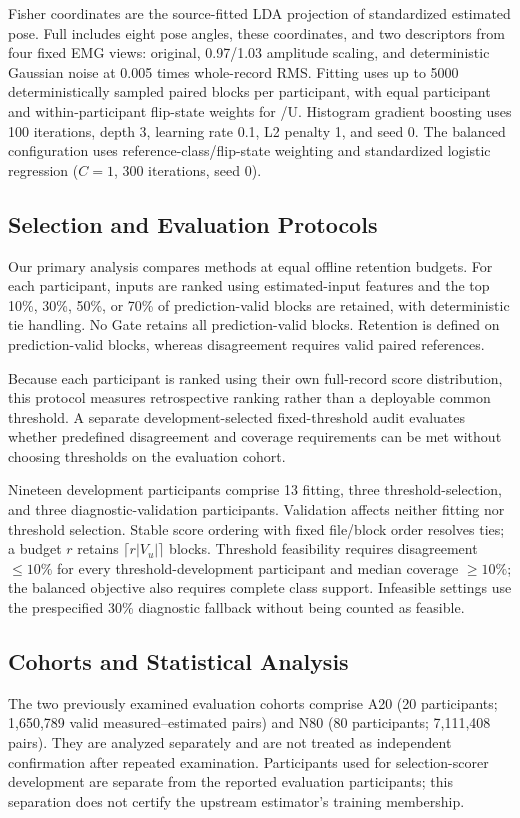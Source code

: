 \documentclass[conference,letterpaper]{IEEEtran}
\begin{document}
Fisher coordinates are the source-fitted LDA projection of standardized estimated pose. Full includes eight pose angles, these coordinates, and two descriptors from four fixed EMG views: original, 0.97/1.03 amplitude scaling, and deterministic Gaussian noise at 0.005 times whole-record RMS. Fitting uses up to 5000 deterministically sampled paired blocks per participant, with equal participant and within-participant flip-state weights for /U. Histogram gradient boosting uses 100 iterations, depth 3, learning rate 0.1, L2 penalty 1, and seed 0. The balanced configuration uses reference-class/flip-state weighting and standardized logistic regression (\(C=1\), 300 iterations, seed 0).



\subsection{Selection and Evaluation Protocols}\label{selection-and-evaluation-protocols}
Our primary analysis compares methods at equal offline retention budgets. For each participant, inputs are ranked using estimated-input features and the top 10\%, 30\%, 50\%, or 70\% of prediction-valid blocks are retained, with deterministic tie handling. No Gate retains all prediction-valid blocks. Retention is defined on prediction-valid blocks, whereas disagreement requires valid paired references.

Because each participant is ranked using their own full-record score distribution, this protocol measures retrospective ranking rather than a deployable common threshold. A separate development-selected fixed-threshold audit evaluates whether predefined disagreement and coverage requirements can be met without choosing thresholds on the evaluation cohort.

Nineteen development participants comprise 13 fitting, three threshold-selection, and three diagnostic-validation participants. Validation affects neither fitting nor threshold selection. Stable score ordering with fixed file/block order resolves ties; a budget \(r\) retains \(\lceil r|V_u|\rceil\) blocks. Threshold feasibility requires disagreement \(\leq10\%\) for every threshold-development participant and median coverage \(\geq10\%\); the balanced objective also requires complete class support. Infeasible settings use the prespecified 30\% diagnostic fallback without being counted as feasible.

\subsection{Cohorts and Statistical Analysis}\label{cohorts-and-statistical-analysis}
The two previously examined evaluation cohorts comprise A20 (20 participants; 1,650,789 valid measured--estimated pairs) and N80 (80 participants; 7,111,408 pairs). They are analyzed separately and are not treated as independent confirmation after repeated examination. Participants used for selection-scorer development are separate from the reported evaluation participants; this separation does not certify the upstream estimator's training membership.
\end{document}
